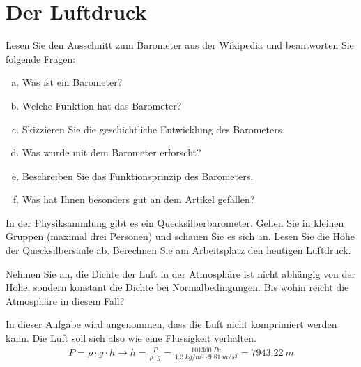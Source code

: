 \section*{Der Luftdruck}

\begin{aufgabe}
	Lesen Sie den Ausschnitt zum Barometer aus der Wikipedia und beantworten Sie folgende Fragen:
	\begin{enumerate} [a)]
		\item Was ist ein Barometer?
		\item Welche Funktion hat das Barometer?
		\item Skizzieren Sie die geschichtliche Entwicklung des Barometers.
		\item Was wurde mit dem Barometer erforscht?
		\item Beschreiben Sie das Funktionsprinzip des Barometers.
		\item Was hat Ihnen besonders gut an dem Artikel gefallen?
	\end{enumerate}
\end{aufgabe}


\begin{aufgabe}
	In der Physiksammlung gibt es ein Quecksilberbarometer. Gehen Sie in kleinen Gruppen (maximal drei Personen)
	und schauen Sie es sich an. Lesen Sie die Höhe der Quecksilbersäule ab.
	Berechnen Sie am Arbeitsplatz den heutigen Luftdruck.
\end{aufgabe}

\begin{aufgabe}
	\label{konstanteDichte}
	Nehmen Sie an, die Dichte der Luft in der Atmosphäre ist nicht abhängig von der Höhe, 
	sondern konstant die Dichte bei Normalbedingungen.
	Bis wohin reicht die Atmosphäre in diesem Fall?
	

	\begin{loesung}
	In dieser Aufgabe wird angenommen, dass die Luft nicht komprimiert werden kann.
	Die Luft soll sich also wie eine Flüssigkeit verhalten.
	\begin{eqnarray*}
		P=\rho\cdot g\cdot h\to h=\frac{P}{\rho\cdot g}=\frac{\SI{101300}{Pa}}{\SI{1.3}{kg/m^3}\cdot\SI{9.81}{m/s^2}}=\SI{7943.22}{m}
	\end{eqnarray*}
	\end{loesung}

\end{aufgabe}

